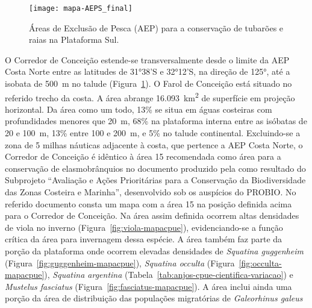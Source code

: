 \documentclass[a4paper,11pt,twoside,showtrims,onecolumn,openright,final]{memoir}
\begin{document}

\begin{figure}
\begin{center}
\texttt{[image: mapa-AEPS\_final]}
\end{center}
\caption{Áreas de Exclusão de Pesca (AEP) para a conservação de tubarões e raias na Plataforma Sul.}
\label{fig:mapa-aeps}
\end{figure}


O Corredor de Conceição estende-se transversalmente desde o limite da AEP Costa Norte entre as latitudes de 31°38'S e 32°12'S, 
na direção de 125°, até a isobata de 500~m no talude (Figura~\ref{fig:mapa-aeps}).  %
O Farol de Conceição está situado
no referido trecho da costa. A área abrange 16.093~km\textsuperscript{2} 
de superfície em projeção horizontal. Da área como um todo, 13\% se situa em águas costeiras 
com profundidades menores que 20~m, 68\% na plataforma interna 
entre as isóbatas de 20 e 100~m, 13\% entre 100 e 200~m, e 5\% no talude continental. 
Excluindo-se a zona de 5 milhas náuticas adjacente à costa, que pertence a AEP Costa Norte, 
o Corredor de Conceição é idêntico à área 15 recomendada 
como área para a  conservação de elasmobrânquios no documento produzido pela \citet{biorio2002} %
como resultado do Subprojeto ``Avaliação e Ações Prioritárias para a Conservação da Biodiversidade 
das Zonas Costeira e Marinha'', desenvolvido sob os auspícios do PROBIO. No referido documento consta 
um mapa com a área 15 na posição definida acima para o Corredor de Conceição. Na área assim definida 
ocorrem altas densidades de viola no inverno (Figura~\ref{fig:viola-mapacpue}), %
evidenciando-se a função crítica da área para invernagem dessa espécie. A área também faz parte da 
porção da plataforma onde ocorrem elevadas densidades de \emph{Squatina guggenheim} (Figura~\ref{fig:guggenheim-mapacpue}),  
\emph{Squatina occulta} (Figura~\ref{fig:occulta-mapacpue}), \emph{Squatina argentina} (Tabela~\ref{tab:anjos-cpue-cientifica-variacao}) %
e \emph{Mustelus fasciatus} (Figura~\ref{fig:fasciatus-mapacpue}). %
A área inclui ainda uma porção da área de distribuição das populações migratórias de \emph{Galeorhinus galeus} 
\end{document}
